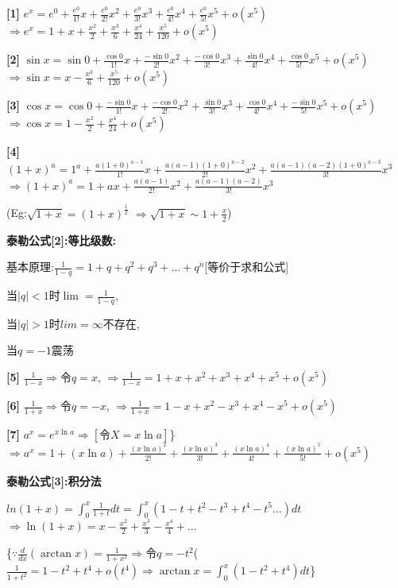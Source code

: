 \documentclass[11pt,a4paper,UTF8]{ctexart}
\begin{document}
\textbf{[1]} $e^x = e^0 + \frac{e^0}{1!}x + \frac{e^0}{2!}x^2 + \frac{e^0}{3!}x^3 + \frac{e^0}{4!}x^4 + \frac{e^0}{5!}x^5 + o(x^5)$		$\Rightarrow e^x = 1 + x + \frac{x^2}{2} + \frac{x^3}{6} + \frac{x^4}{24} + \frac{x^5}{120} + o(x^5)$

\textbf{[2]} $\sin x = \sin 0 + \frac{\cos 0}{1!}x + \frac{-\sin 0}{2!}x^2 + \frac{-\cos 0}{3!}x^3 + \frac{\sin 0}{4!}x^4 + \frac{\cos 0}{5!}x^5 + o(x^5)$ $\Rightarrow \sin x = x - \frac{x^3}{6} + \frac{x^5}{120} + o(x^5)$

\textbf{[3]} $\cos x = \cos 0 + \frac{-\sin 0}{1!}x + \frac{-\cos 0}{2!}x^2 + \frac{\sin 0}{3!}x^3 + \frac{\cos 0}{4!}x^4 + \frac{-\sin 0}{5!}x^5 + o(x^5)$ $\Rightarrow \cos x = 1 - \frac{x^2}{2} + \frac{x^4}{24} + o(x^5)$

\textbf{[4]} $(1+x)^a = 1^a + \frac{a(1+0)^{a-1}}{1!}x + \frac{a(a-1)(1+0)^{a-2}}{2!}x^2 + \frac{a(a-1)(a-2)(1+0)^{a-3}}{3!}x^3$  $\Rightarrow (1+x)^a = 1 + ax + \frac{a(a-1)}{2!}x^2 + \frac{a(a-1)(a-2)}{3!}x^3$

   (Eg:$\sqrt{1+x} = (1+x)^{\frac{1}{2}}$					$\Rightarrow \sqrt{1+x} \sim 1+\frac{x}{2}$)

\textbf{泰勒公式[2]:等比级数:}

基本原理:$\frac{1}{1-q} = 1 + q + q^2 + q^3 + \dots + q^n$[等价于求和公式]

\begin{solbox}[{分步推导与答题规范}]
当$|q|<1$时$\lim = \frac{1}{1-q}$,

当$|q|>1$时$lim=\infty$不存在,

当$q=-1$震荡
\end{solbox}

\textbf{[5]} $\frac{1}{1-x} \Rightarrow$令$q=x$,		$\Rightarrow \frac{1}{1-x} = 1 + x + x^2 + x^3 + x^4 + x^5 + o(x^5)$

\textbf{[6]} $\frac{1}{1+x} \Rightarrow$令$q=-x$,		$\Rightarrow \frac{1}{1+x} = 1 - x + x^2 - x^3 + x^4 - x^5 + o(x^5)$

\textbf{[7]} $a^x = e^{x \ln a} \Rightarrow[\text{令}X = x \ln a]$\} 	$\Rightarrow a^x = 1 + (x \ln a) + \frac{(x \ln a)^2}{2!} + \frac{(x \ln a)^3}{3!} + \frac{(x \ln a)^4}{4!} + \frac{(x \ln a)^5}{5!} + o(x^5)$

\textbf{泰勒公式[3]:积分法}

$ln(1+x) = \int_{0}^{x} \frac{1}{1+t} dt = \int_{0}^{x} (1 - t + t^2 - t^3 + t^4 - t^5 \dots) dt$	$\Rightarrow \ln(1+x) = x - \frac{x^2}{2} + \frac{x^3}{3} - \frac{x^4}{4} + \dots$

\{$\because\frac{d}{dx}(\arctan x) = \frac{1}{1+x^2} \Rightarrow$令$q=-t^2$($\frac{1}{1+t^2} = 1 - t^2 + t^4 + o(t^4)\Rightarrow \arctan x = \int_{0}^{x} (1 - t^2 + t^4) dt$\}
\end{document}
